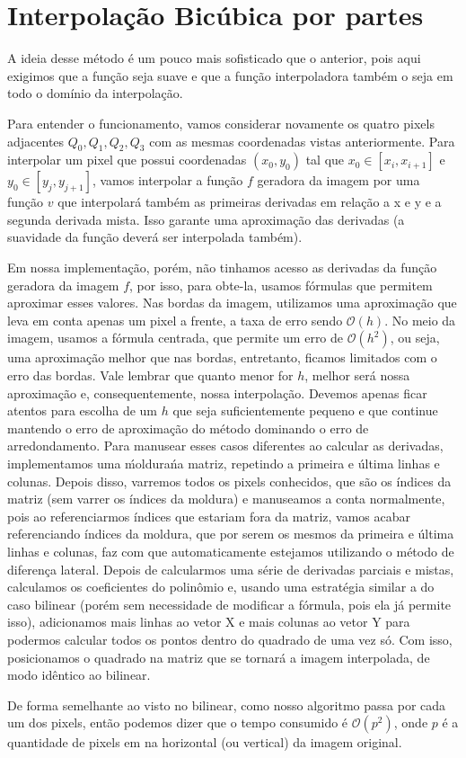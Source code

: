 \documentclass{article}
\begin{document}
	\section{Interpolação Bicúbica por partes}
	A ideia desse método é um pouco mais sofisticado que o anterior, pois aqui exigimos que a função seja suave e que a função interpoladora também o seja em todo o domínio da interpolação. \par
	Para entender o funcionamento, vamos considerar novamente os quatro pixels adjacentes $Q_{0}, Q_{1}, Q_{2}, Q_{3}$ com as mesmas coordenadas vistas anteriormente. Para interpolar um pixel que possui coordenadas $(x_{0}, y_{0})$ tal que $x_{0} \in [x_{i}, x_{i+1}]$ e $y_{0} \in [y_{j}, y_{j+1}]$, vamos interpolar a função $f$ geradora da imagem por uma função $v$ que interpolará também as primeiras derivadas em relação a x e y e a segunda derivada mista. Isso garante uma aproximação das derivadas (a suavidade da função deverá ser interpolada também). \par
	Em nossa implementação, porém, não tinhamos acesso as derivadas da função geradora da imagem $f$, por isso, para obte-la, usamos fórmulas que permitem aproximar esses valores. Nas bordas da imagem, utilizamos uma aproximação que leva em conta apenas um pixel a frente, a taxa de erro sendo $\mathcal{O}(h)$. No meio da imagem, usamos a fórmula centrada, que permite um erro de $\mathcal{O}(h^2)$, ou seja, uma aproximação melhor que nas bordas, entretanto, ficamos limitados com o erro das bordas. Vale lembrar que quanto menor for $h$, melhor será nossa aproximação e, consequentemente, nossa interpolação. Devemos apenas ficar atentos para escolha de um $h$ que seja suficientemente pequeno e que continue mantendo o erro de aproximação do método dominando o erro de arredondamento. Para manusear esses casos diferentes ao calcular as derivadas, implementamos uma \'moldura\' na matriz, repetindo a primeira e última linhas e colunas. Depois disso, varremos todos os pixels conhecidos, que são os índices da matriz (sem varrer os índices da moldura) e manuseamos a conta normalmente, pois ao referenciarmos índices que estariam fora da matriz, vamos acabar referenciando índices da moldura, que por serem os mesmos da primeira e última linhas e colunas, faz com que automaticamente estejamos utilizando o método de diferença lateral. Depois de calcularmos uma série de derivadas parciais e mistas, calculamos os coeficientes do polinômio e, usando uma estratégia similar a do caso bilinear (porém sem necessidade de modificar a fórmula, pois ela já permite isso), adicionamos mais linhas ao vetor X e mais colunas ao vetor Y para podermos calcular todos os pontos dentro do quadrado de uma vez só. Com isso, posicionamos o quadrado na matriz que se tornará a imagem interpolada, de modo idêntico ao bilinear.\par
	De forma semelhante ao visto no bilinear, como nosso algoritmo passa por cada um dos pixels, então podemos dizer que o tempo consumido é $\mathcal{O}(p^2)$, onde $p$ é a quantidade de pixels em na horizontal (ou vertical) da imagem original.
	
\end{document}
